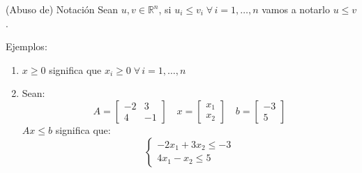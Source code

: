 \documentclass[10pt, aspectratio=169]{beamer}
\begin{document}
\begin{frame}{(Abuso de) Notación}
    Sean $u, v\in\mathbb{R}^n$, si $u_i\leq v_i \;\forall\, i=1,\dots, n$ vamos a notarlo $u\leq v$.
    
    Ejemplos:
    \begin{enumerate}
        \item $x \geq 0$ significa que $x_i\geq 0\;\forall\, i=1,\dots, n$
        \item Sean:
        \[A = \begin{bmatrix} -2 & 3 \\ 4 & -1\end{bmatrix} \quad 
        x=\begin{bmatrix}x_1 \\ x_2\end{bmatrix} \quad b=\begin{bmatrix}-3 \\ 5\end{bmatrix}\]
        $Ax\leq b$ significa que:
        \[\begin{cases}
            -2x_1 + 3x_2 \leq -3 \\
            4x_1 - x_2 \leq 5
        \end{cases}\]
    \end{enumerate}
\end{frame}
\end{document}
